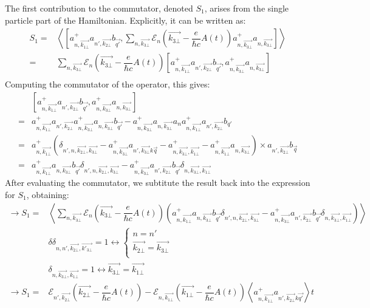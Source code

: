 \documentclass{article}
\begin{document}
The first contribution to the commutator, denoted $S_1$, arises from the single particle part of the Hamiltonian. Explicitly, it can be written as:
\begin{align*}
    S_1 = & \left \langle \left[a^+_{n,\vec{k_{1\bot}}}a_{n',\vec{k_{2\bot}}}b_{\vec{q'}}, \sum_{n,\vec{k_{3\bot}}}\mathcal{E}_{n} \left(\vec{k_{3\bot}}-\dfrac{e}{\hbar c}A(t)\right)a^+_{n,\vec{k_{3\bot}}}a_{n,\vec{k_{3\bot}}}\right] \right \rangle \\
    = & \sum_{n,\vec{k_{3\bot}}}\mathcal{E}_{n}\left(\vec{k_{3\bot}}-\dfrac{e}{\hbar c}A(t)\right)  \left[a^+_{n,\vec{k_{1\bot}}}a_{n',\vec{k_{2\bot}}}b_{\vec{q'}},a^+_{n,\vec{k_{3\bot}}}a_{n,\vec{k_{3\bot}}} \right]  \\
\end{align*}
Computing the commutator of the operator, this gives: 
\begin{align*}
    & \left[a^+_{n,\vec{k_{1\bot}}}a_{n',\vec{k_{2\bot}}}b_{\vec{q'}},a^+_{n,\vec{k_{3\bot}}}a_{n,\vec{k_{3\bot}}} \right]\\
     = & a^+_{n,\vec{k_{1\bot}}}a_{n',\vec{k_{2\bot}}}a^+_{n, \vec{k_{3\bot}}}a_{n, \vec{k_{3\bot}}}b_{\vec{q'}}-a^+_{n,\vec{k_{3\bot}}}a_{n, \vec{k_{3\bot}}}a_na^+_{n, \vec{k_{1\bot}}}a_{n', \vec{k_{2\bot}}}b_{q'}\\
     = & a^+_{n,\vec{k_{1\bot}}} \left(\delta_{n',n,\vec{k_{2\bot}}, \vec{k_{3\bot}}}-a^+_{n, \vec{k_{3\bot}}}a_{n',\vec{k_{3\bot}}k\vec{q}}-a^+_{n,\vec{k_{3\bot}},\vec{k_{1\bot}}}-a^+_{n, \vec{k_{1\bot}}}a_{n,\vec{k_{3\bot}}}\right) \times a_{n',\vec{k_{2\bot}}}b_{\vec{q}}\\
     = & a^+_{n,\vec{k_{1\bot}}} a_{n, \vec{k_{3\bot}}}b_{\vec{q'}}\delta_{n',n, \vec{k_{2\bot}}, \vec{k_{3\bot}}}- a^+_{n, \vec{k_{3\bot}}}a_{n', \vec{k_{2\bot}}}b_{\vec{q'}} \delta_{n, \vec{k_{3\bot}}, \vec{k_{1\bot}}}
\end{align*}
After evaluating the commutator, we subtitute the result back into the expression for $S_1$, obtaining:
\begin{align*}
    \rightarrow S_1 = & \left\langle \sum_{n,\vec{k_{3\bot}}} \mathcal{E}_{n}\left(\vec{k_{3\bot}}-\dfrac{e}{\hbar c}A(t)\right) \left(a^+_{n,\vec{k_{1\bot}}} a_{n, \vec{k_{3\bot}}}b_{\vec{q'}}\delta_ {n',n, \vec{k_{2\bot}}, \vec{k_{3\bot}}}- a^+_{n, \vec{k_{3\bot}}}a_{n', \vec{k_{2\bot}}}b_{\vec{q'}}\delta_{n, \vec{k_{3\bot}}, \vec{k_{1\bot}}} \right)\right\rangle \\
    & \delta\delta_{n,n', \vec{k_{2\bot}},\vec{k'_{3\bot}}}=1 \leftrightarrow \begin{cases}
        n = n'\\
        \vec{k_{2\bot}}= \vec{k_{3\bot}}\\
    \end{cases} \\
    & \delta_{n, \vec{k_{3\bot}}, \vec{k_{1\bot}}}= 1 \leftrightarrow \vec{k_{3\bot}} = \vec{k_{1\bot}}\\
    \rightarrow S_1 = & \mathcal{E}_{n',\vec{k_{2\bot}}}\left(\vec{k_{2\bot}}-\dfrac{e}{\hbar c}A(t)\right)-\mathcal{E}_{n, \vec{k_{1\bot}}}\left(\vec{k_{1\bot}}-\dfrac{e}{\hbar c}A(t)\right)\left \langle a^+_{n, \vec{k_{1\bot}}}a_{n',\vec{k_{2\bot}}k\vec{q'}}\right \rangle t \\
\end{align*}
\end{document}
